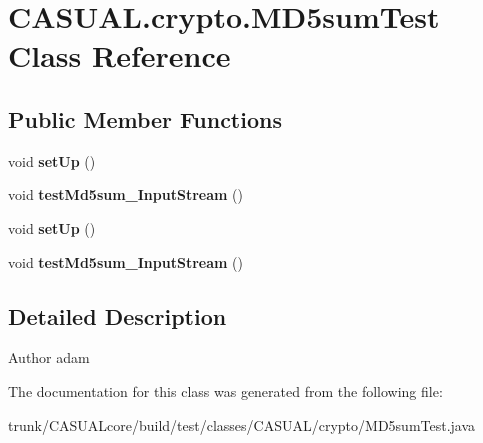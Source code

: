 \hypertarget{class_c_a_s_u_a_l_1_1crypto_1_1_m_d5sum_test}{\section{C\-A\-S\-U\-A\-L.\-crypto.\-M\-D5sum\-Test Class Reference}
\label{class_c_a_s_u_a_l_1_1crypto_1_1_m_d5sum_test}
}
\subsection*{Public Member Functions}
\begin{DoxyCompactItemize}
\item 
\hypertarget{class_c_a_s_u_a_l_1_1crypto_1_1_m_d5sum_test_a03b77b8c2dbe1c4566d288d7b92c7d56}{void {\bfseries set\-Up} ()}\label{class_c_a_s_u_a_l_1_1crypto_1_1_m_d5sum_test_a03b77b8c2dbe1c4566d288d7b92c7d56}

\item 
\hypertarget{class_c_a_s_u_a_l_1_1crypto_1_1_m_d5sum_test_a90b541e86a5e7b31e8033e9e5a2a69a0}{void {\bfseries test\-Md5sum\-\_\-\-Input\-Stream} ()}\label{class_c_a_s_u_a_l_1_1crypto_1_1_m_d5sum_test_a90b541e86a5e7b31e8033e9e5a2a69a0}

\item 
\hypertarget{class_c_a_s_u_a_l_1_1crypto_1_1_m_d5sum_test_a03b77b8c2dbe1c4566d288d7b92c7d56}{void {\bfseries set\-Up} ()}\label{class_c_a_s_u_a_l_1_1crypto_1_1_m_d5sum_test_a03b77b8c2dbe1c4566d288d7b92c7d56}

\item 
\hypertarget{class_c_a_s_u_a_l_1_1crypto_1_1_m_d5sum_test_a90b541e86a5e7b31e8033e9e5a2a69a0}{void {\bfseries test\-Md5sum\-\_\-\-Input\-Stream} ()}\label{class_c_a_s_u_a_l_1_1crypto_1_1_m_d5sum_test_a90b541e86a5e7b31e8033e9e5a2a69a0}

\end{DoxyCompactItemize}


\subsection{Detailed Description}
\begin{DoxyAuthor}{Author}
adam 
\end{DoxyAuthor}


The documentation for this class was generated from the following file\-:\begin{DoxyCompactItemize}
\item 
trunk/\-C\-A\-S\-U\-A\-Lcore/build/test/classes/\-C\-A\-S\-U\-A\-L/crypto/M\-D5sum\-Test.\-java\end{DoxyCompactItemize}
